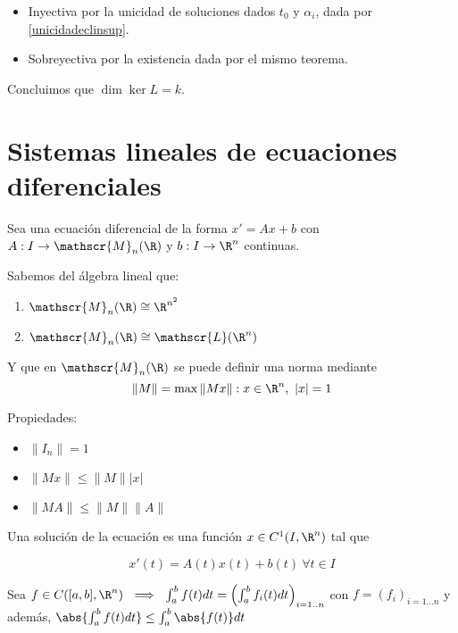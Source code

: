 \begin{itemize}
\item Inyectiva por la unicidad de soluciones dados $t_0$ y $\alpha_i$, dada por \ref{unicidadeclinsup}.
\item Sobreyectiva por la existencia dada por el mismo teorema.
\end{itemize}

Concluimos que $\dim \ker L = k$.

\section{Sistemas lineales de ecuaciones diferenciales}

Sea una ecuación diferencial de la forma $x' = Ax+b$ con $A: I \to \mathscr{M}_n (\R)$ y $b:I \to \R ^n$ continuas.

\begin{nota} Sabemos del álgebra lineal que:

  \begin{enumerate}
  \item $\mathscr{M}_n (\R) \cong \R ^{n^2}$
  \item $\mathscr{M}_n (\R) \cong \mathscr{L}(\R^n)$
  \end{enumerate}

  Y que en $\mathscr{M}_n(\R)$ se puede definir una norma mediante
  \[
  \|M\| = \max { \|Mx\| : x \in \R ^n , \ |x| = 1}
  \]

  Propiedades:

  \begin{itemize}
  \item $\|I_n \| = 1$
  \item $ \|Mx\| \leq \|M\| |x|$
  \item $ \|MA\| \leq \|M\| \|A\|$
  \end{itemize}

\end{nota}

\begin{ndef}

  Una solución de la ecuación es una función $x \in C^1 (I, \R ^n )$ tal que

  \[x'(t) = A(t) x(t) + b(t) \ \forall t \in I\]

\end{ndef}

Sea $f\in C([a,b], \R ^n ) \ \implies \ \int_a ^b f(t) dt = \left(\int _a ^b f_i (t) dt\right) _{i = 1..n} $ con $f = (f_i)_{i = 1...n}$ y además, $ \abs{ \int _a ^b f(t) dt } \leq \int_a ^b \abs{f(t)} dt $

